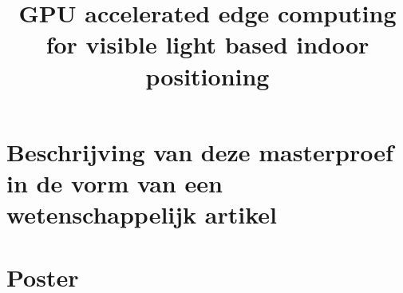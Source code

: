 \documentclass[11pt,a4paper,twoside,openright]{report}
\title{GPU accelerated edge computing for visible light based indoor positioning
}
\begin{document}
\preface






\appendix


\chapter{Beschrijving van deze masterproef in de vorm van een wetenschappelijk artikel}
%

\chapter{Poster}
%


\end{document}
